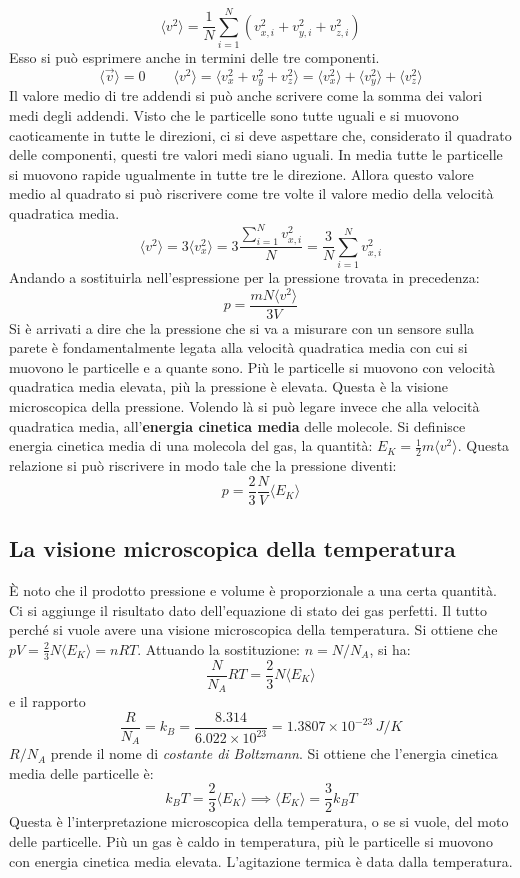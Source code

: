 \documentclass[10pt,a4paper]{book}
\begin{document}
\[
	\langle v^2 \rangle = \frac{1}{N} \sum_{i=1}^N (v_{x,i}^2 +v_{y,i}^2 + v_{z,i}^2)
\]
Esso si può esprimere anche in termini delle tre componenti.
\[
	\langle \vec{v} \rangle = 0 \qquad \langle v^2 \rangle = \langle v_x^2 +v_y^2 +v_z^2 \rangle = \langle v_x^2 \rangle + \langle v_y^2 \rangle + \langle v_z^2 \rangle
\]
Il valore medio di tre addendi si può anche scrivere come la somma dei valori medi degli addendi. Visto che le particelle sono tutte uguali e si muovono caoticamente in tutte le direzioni, ci si deve aspettare che, considerato il quadrato delle componenti, questi tre valori medi siano uguali. In media tutte le particelle si muovono rapide ugualmente in tutte tre le direzione. Allora questo valore medio al quadrato si può riscrivere come tre volte il valore medio della velocità quadratica media.
\[
	\langle v^2 \rangle = 3 \langle v_x^2 \rangle = 3 \frac{\sum_{i=1}^N v_{x,i}^2}{N} = \frac{3}{N} \sum_{i=1}^N v_{x,i}^2
\]
Andando a sostituirla nell'espressione per la pressione trovata in precedenza:
\[
	\boxed{p = \frac{mN\langle v^2 \rangle}{3V}}
\]
Si è arrivati a dire che la pressione che si va a misurare con un sensore sulla parete è fondamentalmente legata alla velocità quadratica media con cui si muovono le particelle e a quante sono. Più le particelle si muovono con velocità quadratica media elevata, più la pressione è elevata. Questa è la visione microscopica della pressione. Volendo là si può legare invece che alla velocità quadratica media, all'\textbf{energia cinetica media} delle molecole. Si definisce energia cinetica media di una molecola del gas, la quantità: $E_K = \frac{1}{2} m\langle v^2 \rangle$. Questa relazione si può riscrivere in modo tale che la pressione diventi:
\[
	\boxed{p = \frac{2}{3} \frac{N}{V} \langle E_K \rangle}
\]

\subsection{La visione microscopica della temperatura}

È noto che il prodotto pressione e volume è proporzionale a una certa quantità. Ci si aggiunge il risultato dato dell'equazione di stato dei gas perfetti. Il tutto perché si vuole avere una visione microscopica della temperatura.
Si ottiene che $pV = \frac{2}{3} N \langle E_K \rangle = nRT$. Attuando la sostituzione: $n=N/N_A$, si ha:
\[
	\frac{N}{N_A } RT = \frac{2}{3} N \langle E_K \rangle
\]
e il rapporto
\[
	\frac{R}{N_A } = k_B = \frac{8.314}{6.022 \times 10^{23} } = 1.3807 \times 10^{-23}\,J/K
\]
$R/N_A$ prende il nome di \emph{costante di Boltzmann}. Si ottiene che l'energia cinetica media delle particelle è:
\[
	k_B T = \frac{2}{3} \langle E_K \rangle \implies \boxed{\langle E_K \rangle = \frac{3}{2} k_B T}
\]
Questa è l'interpretazione microscopica della temperatura, o se si vuole, del moto delle particelle. Più un gas è caldo in temperatura, più le particelle si muovono con energia cinetica media elevata. L'agitazione termica è data dalla temperatura.
\end{document}
